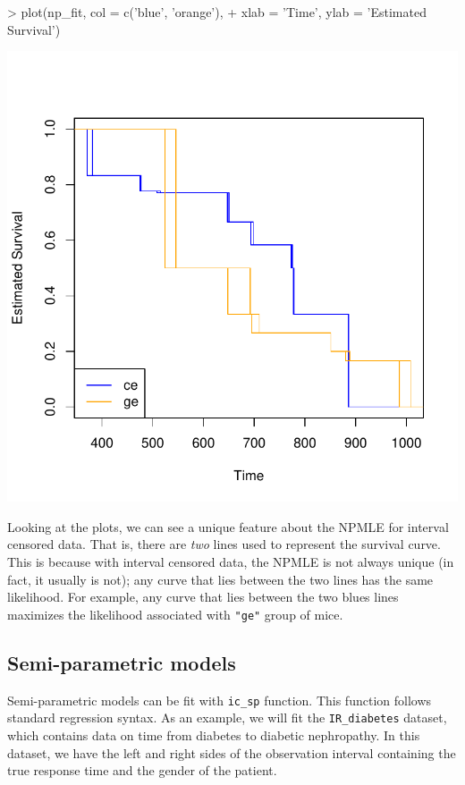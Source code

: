 \documentclass[a4paper]{article}
\begin{document}
\begin{Schunk}
\begin{Sinput}
> plot(np_fit, col = c('blue', 'orange'),
+      xlab = 'Time', ylab = 'Estimated Survival')
\end{Sinput}
\end{Schunk}
\includegraphics{icenReg-005}


Looking at the plots, we can see a unique feature about the NPMLE for interval censored data. That is, there are \emph{two} lines used to represent the survival curve. This is because with interval censored data, the NPMLE is not always unique (in fact, it usually is not); any curve that lies between the two lines has the same likelihood. For example, any curve that lies between the two blues lines maximizes the likelihood associated with \texttt{"ge"} group of mice. 


\subsection{Semi-parametric models}

Semi-parametric models can be fit with \texttt{ic\_sp} function. This function follows standard regression syntax. As an example, we will fit the \texttt{IR\_diabetes} dataset, which contains data on time from diabetes to diabetic nephropathy. In this dataset, we have the left and right sides of the observation interval containing the true response time and the gender of the patient. 
  
\end{document}
